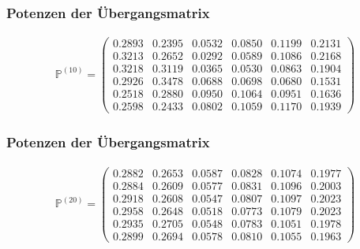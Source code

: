 \documentclass[compress]{beamer}
\begin{document}
	\begin{frame}
		\frametitle{Potenzen der Übergangsmatrix}
		\begin{center}
			\begin{align*}
				\mathbb{P} ^{(10)} =
				\begin{pmatrix} 
				  0.2893 &  0.2395 &  0.0532 &  0.0850 &  0.1199 &  0.2131\\
				  0.3213 &  0.2652 &  0.0292 &  0.0589 &  0.1086 &  0.2168\\
				  0.3218 &  0.3119 &  0.0365 &  0.0530 &  0.0863 &  0.1904\\
				  0.2926 &  0.3478 &  0.0688 &  0.0698 &  0.0680 &  0.1531\\
				  0.2518 &  0.2880 &  0.0950 &  0.1064 &  0.0951 &  0.1636\\
				  0.2598 &  0.2433 &  0.0802 &  0.1059 &  0.1170 &  0.1939
				\end{pmatrix} 
			\end{align*}
		\end{center}
	\end{frame}

	\begin{frame}
		\frametitle{Potenzen der Übergangsmatrix}
		\begin{center}
			\begin{align*}
				\mathbb{P} ^{(20)} =
				\begin{pmatrix} 
				  0.2882 &  0.2653 &  0.0587 &  0.0828 &  0.1074 &  0.1977\\
				  0.2884 &  0.2609 &  0.0577 &  0.0831 &  0.1096 &  0.2003\\
				  0.2918 &  0.2608 &  0.0547 &  0.0807 &  0.1097 &  0.2023\\
				  0.2958 &  0.2648 &  0.0518 &  0.0773 &  0.1079 &  0.2023\\
				  0.2935 &  0.2705 &  0.0548 &  0.0783 &  0.1051 &  0.1978\\
				  0.2899 &  0.2694 &  0.0578 &  0.0810 &  0.1055 &  0.1963
				\end{pmatrix} 
			\end{align*}
		\end{center}
	\end{frame}
\end{document}
